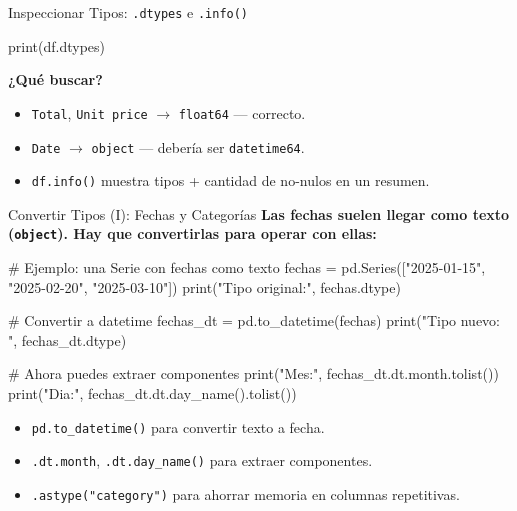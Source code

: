 \documentclass[aspectratio=169, 11pt]{beamer}
\begin{document}
\begin{frame}[fragile,shrink=28]{Inspeccionar Tipos: \texttt{.dtypes} e \texttt{.info()}}
  \vspace{-6pt}
  \begin{pyblock}
print(df.dtypes)
  \end{pyblock}

  \vspace{4pt}
  {\footnotesize\color{arcaDark}\bfseries ¿Qué buscar?}
  \vspace{2pt}
  {\scriptsize\color{textMuted}
  \begin{itemize}\setlength{\itemsep}{3pt}
    \item[{\color{codeGreen}\scriptsize\faCheckCircle}]
      \texttt{Total}, \texttt{Unit price} $\to$ \texttt{float64} --- correcto.
    \item[{\color{codeOrange}\scriptsize\faExclamationTriangle}]
      \texttt{Date} $\to$ \texttt{object} --- debería ser \texttt{datetime64}.
    \item[{\color{arcaRed}\scriptsize\faArrowRight}]
      \texttt{df.info()} muestra tipos + cantidad de no-nulos en un resumen.
  \end{itemize}
  }
\end{frame}

\begin{frame}[fragile,shrink=28]{Convertir Tipos (I): Fechas y Categorías}
  \vspace{-6pt}
  {\footnotesize\color{arcaDark}\bfseries
    Las fechas suelen llegar como texto (\texttt{object}).
    Hay que convertirlas para operar con ellas:}

  \vspace{4pt}
  \begin{pyblock}
# Ejemplo: una Serie con fechas como texto
fechas = pd.Series(["2025-01-15", "2025-02-20",
                     "2025-03-10"])
print("Tipo original:", fechas.dtype)

# Convertir a datetime
fechas_dt = pd.to_datetime(fechas)
print("Tipo nuevo:   ", fechas_dt.dtype)

# Ahora puedes extraer componentes
print("Mes:", fechas_dt.dt.month.tolist())
print("Dia:", fechas_dt.dt.day_name().tolist())
  \end{pyblock}

  \vspace{4pt}
  {\scriptsize\color{textMuted}
  \begin{itemize}\setlength{\itemsep}{3pt}
    \item[{\color{arcaRed}\scriptsize\faArrowRight}]
      \texttt{pd.to\_datetime()} para convertir texto a fecha.
    \item[{\color{arcaRed}\scriptsize\faArrowRight}]
      \texttt{.dt.month}, \texttt{.dt.day\_name()} para extraer componentes.
    \item[{\color{arcaRed}\scriptsize\faArrowRight}]
      \texttt{.astype("category")} para ahorrar memoria en columnas repetitivas.
  \end{itemize}
  }
\end{frame}
\end{document}
